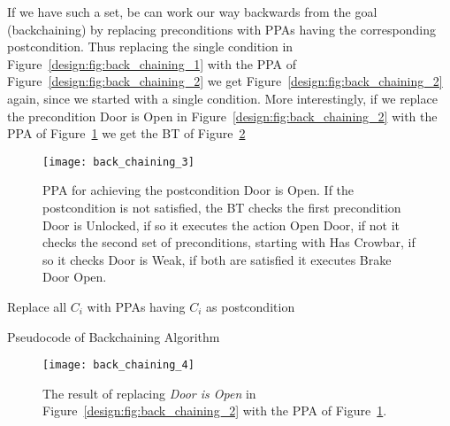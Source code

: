 If we have such a set, be can work our way backwards from the goal (backchaining) by replacing preconditions with PPAs having the corresponding postcondition. Thus replacing the single condition in Figure~\ref{design:fig:back_chaining_1} with the PPA of Figure~\ref{design:fig:back_chaining_2} we get Figure~\ref{design:fig:back_chaining_2} again, since we started with a single condition.
More interestingly, if we replace the precondition Door is Open in Figure~\ref{design:fig:back_chaining_2} with the PPA of Figure~\ref{design:fig:back_chaining_3} we get the BT of Figure~\ref{design:fig:back_chaining_4}

\begin{figure}[h]
\centering
\texttt{[image: back\_chaining\_3]}

\caption{PPA for achieving the postcondition Door is Open. If the postcondition is not satisfied, the BT checks the first precondition Door is Unlocked, if so it executes the action Open Door, if not it checks the second set of preconditions, starting with Has Crowbar, if so it checks Door is Weak, if both are satisfied it executes Brake Door Open.}

\label{design:fig:back_chaining_3}
\end{figure}


\begin{algorithm2e}[h]
  Replace all $C_i$ with PPAs having $C_i$ as postcondition\;
     \caption{Pseudocode of Backchaining Algorithm}
  \label{design:alg:backchaining}
\end{algorithm2e}



\begin{figure}[h]
\centering
\texttt{[image: back\_chaining\_4]}
\caption{The result of replacing \emph{Door is Open} in Figure~\ref{design:fig:back_chaining_2} with the PPA of Figure~\ref{design:fig:back_chaining_3}.}
\label{design:fig:back_chaining_4}
\end{figure}

